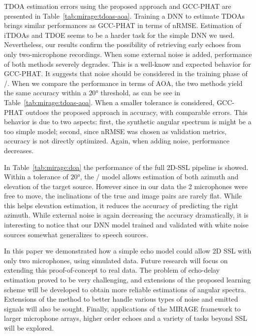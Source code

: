 \mynewline
\ac{TDOA} estimation errors using the proposed approach and \ac{GCC-PHAT} are presented in Table~\cref{tab:mirage:tdoas-aoa}.
Training a \ac{DNN} to estimate \acp{TDOA} brings similar performances as \ac{GCC-PHAT} in terms of \ac{nRMSE}.
Estimation of \acp{iTDOA} and \ac{TDOE} seems to be a harder task for the simple \ac{DNN} we used.
Nevertheless, our results confirm the possibility of retrieving early echoes from only two-microphone recordings.
When some external noise is added, performance of both methods severely degrades.
This is a well-know and expected behavior for \ac{GCC-PHAT}.
It suggests that noise should be considered in the training phase of \MIRAGE/.
When we compare the performance in terms of \ac{AOA}, the two methods yield the same accuracy within a $\ang{20}$ threshold, as can be see in Table~\cref{tab:mirage:tdoas-aoa}.
When a smaller tolerance is considered, GCC-PHAT outdoes the proposed approach in accuracy, with comparable errors.
This behavior is due to two aspects: first, the synthetic angular spectrum is might be a too simple model; second, since \ac{nRMSE} was chosen as validation metrics, accuracy is not directly optimized.
Again, when adding noise, performance decreases.

\mynewline
In Table~\cref{tab:mirage:doa} the performance of the full 2D-SSL pipeline is showed.
Within a tolerance of $\ang{20}$, the \MIRAGE/ model allows estimation of both azimuth and elevation of the target source.
However since in our data the 2 microphones were free to move, the inclinations of the true and image pairs are rarely flat.
While this helps elevation estimation, it reduces the accuracy of predicting the right azimuth.
While external noise is again decreasing the accuracy dramatically,
it is interesting to notice that our \ac{DNN} model trained and validated with white noise sources somewhat generalizes to speech sources.

\mynewline
In this paper we demonstrated how a simple echo model could allow 2D SSL with only two microphones, using simulated data.
Future research will focus on extending this proof-of-concept to real data.
The problem of echo-delay estimation proved to be very challenging, and extensions of the proposed learning scheme will be developed to obtain more reliable estimations of angular spectra.
Extensions of the method to better handle various types of noise and emitted signals will also be sought.
Finally, applications of the MIRAGE framework to larger microphone arrays, higher order echoes and a variety of tasks beyond SSL will be explored.


